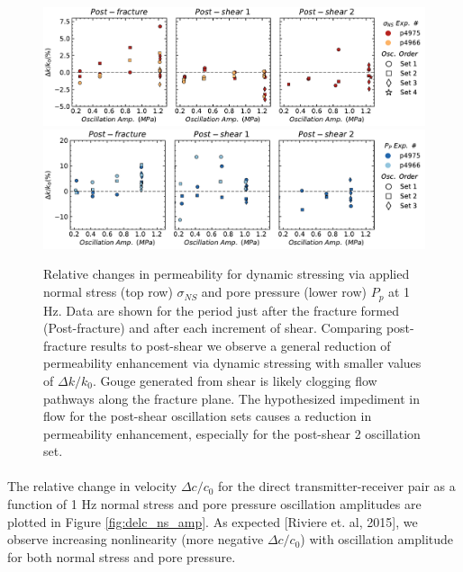 \documentclass[letterpaper,10pt]{article}
\begin{document}
\clearpage

\begin{figure}[ht]
	\centering
	\includegraphics[width=1\columnwidth]{delk_amp_NS}
	\includegraphics[width=1\columnwidth]{delk_amp_PP}
	\caption{Relative changes in permeability for dynamic stressing via applied normal stress (top row)  $ \sigma_{NS} $ and pore pressure (lower row) $ P_p $ at 1 Hz. Data are shown for the period just after the fracture formed (Post-fracture) and after each increment of shear. Comparing post-fracture results to post-shear we observe a general reduction of permeability enhancement via dynamic stressing with smaller values of $ \Delta k/k_0 $. Gouge generated from shear is likely clogging flow pathways along the fracture plane. The hypothesized impediment in flow for the post-shear oscillation sets causes a reduction in permeability enhancement, especially for the post-shear 2 oscillation set.}
	\label{fig:perm_ns_amp}
\end{figure}

\clearpage

\paragraph{}
The relative change in velocity $ \Delta c/c_0 $ for the direct transmitter-receiver pair as a function of 1 Hz normal stress and pore pressure oscillation amplitudes are plotted in Figure \ref{fig:delc_ns_amp}. As expected [Riviere et. al, 2015], we observe increasing nonlinearity (more negative $ \Delta c/c_0 $) with oscillation amplitude for both normal stress and pore pressure. 
\end{document}

